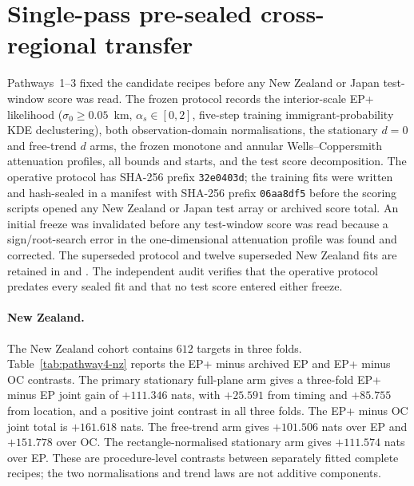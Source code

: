 \section{Single-pass pre-sealed cross-regional transfer}\label{sec:pathway4-transfer}

Pathways~1--3 fixed the candidate recipes before any New Zealand or Japan test-window score was read. The frozen protocol records the interior-scale EP+ likelihood ($\sigma_0\geq0.05$~km, $\alpha_s\in[0,2]$, five-step training immigrant-probability KDE declustering), both observation-domain normalisations, the stationary $d=0$ and free-trend $d$ arms, the frozen monotone and annular Wells--Coppersmith attenuation profiles, all bounds and starts, and the test score decomposition. The operative protocol has SHA-256 prefix \texttt{32e0403d}; the training fits were written and hash-sealed in a manifest with SHA-256 prefix \texttt{06aa8df5} before the scoring scripts opened any New Zealand or Japan test array or archived score total. An initial freeze was invalidated before any test-window score was read because a sign/root-search error in the one-dimensional attenuation profile was found and corrected. The superseded protocol and twelve superseded New Zealand fits are retained in  and . The independent audit verifies that the operative protocol predates every sealed fit and that no test score entered either freeze.

\paragraph{New Zealand.}
The New Zealand cohort contains $612$ targets in three folds. Table~\ref{tab:pathway4-nz} reports the EP+ minus archived EP and EP+ minus OC contrasts. The primary stationary full-plane arm gives a three-fold EP+ minus EP joint gain of $+111.346$ nats, with $+25.591$ from timing and $+85.755$ from location, and a positive joint contrast in all three folds. The EP+ minus OC joint total is $+161.618$ nats. The free-trend arm gives $+101.506$ nats over EP and $+151.778$ over OC. The rectangle-normalised stationary arm gives $+111.574$ nats over EP. These are procedure-level contrasts between separately fitted complete recipes; the two normalisations and trend laws are not additive components.

